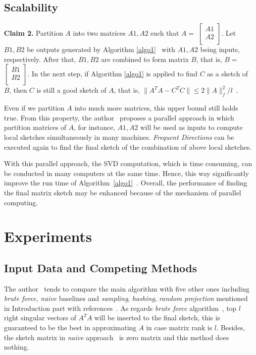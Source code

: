 \documentclass{acm_proc_article-sp}
\begin{document}
\subsection{Scalability}

\textbf{Claim 2.} Partition $A$ into two matrices $A1, A2$ such that $A =$
$\begin{bmatrix}
A1\\
A2\\
\end{bmatrix}$. Let $B1, B2$ be outputs generated by Algorithm \ref{algo1}~\cite{ref1} with $A1, A2$ being inputs, respectively. After that, $B1, B2$ are combined to form matrix $B$, that is, $B =$
$\begin{bmatrix}
B1\\
B2\\
\end{bmatrix}$. In the next step, if Algorithm \ref{algo1} is applied to find $C$ as a sketch of $B$, then $C$ is still a good sketch of $A$, that is, $\|A^TA - C^TC\| \leq 2\|A\|^2_{f} / l$~\cite{ref1}.

Even if we partition $A$ into much more matrices, this upper bound still holds true. From this property, the author~\cite{ref1} proposes a parallel approach in which partition matrices of $A$, for instance, $A1, A2$ will be used as inputs to compute local sketches simultaneously in many machines. \textit{Frequent Directions} can be executed again to find the final sketch of the combination of above local sketches.

With this parallel approach, the SVD computation, which is time consuming, can be conducted in many computers at the same time. Hence, this way significantly improve the run time of Algorithm~\ref{algo1}~\cite{ref1}. Overall, the performance of finding the final matrix sketch may be enhanced because of the mechanism of parallel computing.

\section{Experiments}

\subsection{Input Data and Competing Methods}

The author~\cite{ref1} tends to compare the main algorithm with five other ones including \textit{brute force, naive} baselines and \textit{sampling}, \textit{hashing}, \textit{random projection} mentioned in Introduction part with references~\cite{ref1}. As regards \textit{brute force} algorithm~\cite{ref1}, top $l$ right singular vectors of $A^TA$ will be inserted to the final sketch, this is guaranteed to be the best in approximating $A$ in case matrix rank is $l$. Besides, the sketch matrix in \textit{naive} approach~\cite{ref1} is zero matrix and this method does nothing.
\end{document}
